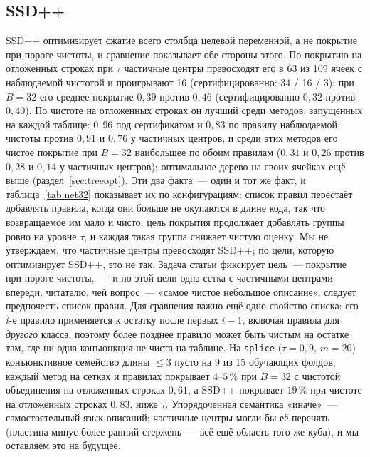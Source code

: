 \documentclass[11pt]{article}
\begin{document}
\subsection{SSD++}\label{sec:ssdpp}
SSD++ оптимизирует сжатие всего столбца целевой переменной, а не покрытие при пороге чистоты, и сравнение показывает обе стороны этого. По покрытию на отложенных строках при $\tau$ частичные центры превосходят его в 63 из 109 ячеек с наблюдаемой чистотой и проигрывают 16 (сертифицированно: 34 / 16 / 3); при $B=32$ его среднее покрытие $0{,}39$ против $0{,}46$ (сертифицированно $0{,}32$ против $0{,}40$). По чистоте на отложенных строках он лучший среди методов, запущенных на каждой таблице: $0{,}96$ под сертификатом и $0{,}83$ по правилу наблюдаемой чистоты против $0{,}91$ и $0{,}76$ у частичных центров, и среди этих методов его чистое покрытие при $B=32$ наибольшее по обоим правилам ($0{,}31$ и $0{,}26$ против $0{,}28$ и $0{,}14$ у частичных центров); оптимальное дерево на своих ячейках ещё выше (раздел~\ref{sec:treeopt}). Эти два факта~--- один и тот же факт, и таблица~\ref{tab:net32} показывает их по конфигурациям: список правил перестаёт добавлять правила, когда они больше не окупаются в длине кода, так что возвращаемое им мало и чисто; цель покрытия продолжает добавлять группы ровно на уровне $\tau$, и каждая такая группа снижает чистую оценку. Мы не утверждаем, что частичные центры превосходят SSD++; по цели, которую оптимизирует SSD++, это не так. Задача статьи фиксирует цель~--- покрытие при пороге чистоты,~--- и по этой цели одна сетка с частичными центрами впереди; читателю, чей вопрос~--- «самое чистое небольшое описание», следует предпочесть список правил. Для сравнения важно ещё одно свойство списка: его $i$-е правило применяется к остатку после первых $i-1$, включая правила для \emph{другого} класса, поэтому более позднее правило может быть чистым на остатке там, где ни одна конъюнкция не чиста на таблице. На \texttt{splice} ($\tau=0{,}9$, $m=20$) конъюнктивное семейство длины $\le3$ пусто на 9 из 15 обучающих фолдов, каждый метод на сетках и правилах покрывает $4$--$5\,\%$ при $B=32$ с чистотой объединения на отложенных строках $0{,}61$, а SSD++ покрывает $19\,\%$ при чистоте на отложенных строках $0{,}83$, ниже $\tau$. Упорядоченная семантика «иначе»~--- самостоятельный язык описаний; частичные центры могли бы её перенять (пластина минус более ранний стержень~--- всё ещё область того же куба), и мы оставляем это на будущее.
\end{document}
